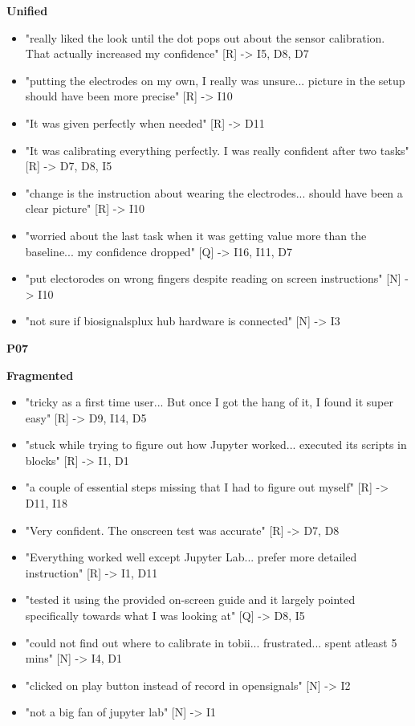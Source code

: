 \documentclass[
]{article}
\begin{document}
\textbf{Unified}

\begin{itemize}
\item
  "really liked the look until the dot pops out about the sensor calibration. That actually increased my confidence" {[}R{]} -\textgreater{} I5, D8, D7
\item
  "putting the electrodes on my own, I really was unsure... picture in the setup should have been more precise" {[}R{]} -\textgreater{} I10
\item
  "It was given perfectly when needed" {[}R{]} -\textgreater{} D11
\item
  "It was calibrating everything perfectly. I was really confident after two tasks" {[}R{]} -\textgreater{} D7, D8, I5
\item
  "change is the instruction about wearing the electrodes... should have been a clear picture" {[}R{]} -\textgreater{} I10
\item
  "worried about the last task when it was getting value more than the baseline... my confidence dropped" {[}Q{]} -\textgreater{} I16, I11, D7
\item
  "put electorodes on wrong fingers despite reading on screen instructions" {[}N{]} -\textgreater{} I10
\item
  "not sure if biosignalsplux hub hardware is connected" {[}N{]} -\textgreater{} I3
\end{itemize}

\textbf{P07}

\textbf{Fragmented}

\begin{itemize}
\item
  "tricky as a first time user... But once I got the hang of it, I found it super easy" {[}R{]} -\textgreater{} D9, I14, D5
\item
  "stuck while trying to figure out how Jupyter worked... executed its scripts in blocks" {[}R{]} -\textgreater{} I1, D1
\item
  "a couple of essential steps missing that I had to figure out myself" {[}R{]} -\textgreater{} D11, I18
\item
  "Very confident. The onscreen test was accurate" {[}R{]} -\textgreater{} D7, D8
\item
  "Everything worked well except Jupyter Lab... prefer more detailed instruction" {[}R{]} -\textgreater{} I1, D11
\item
  "tested it using the provided on-screen guide and it largely pointed specifically towards what I was looking at" {[}Q{]} -\textgreater{} D8, I5
\item
  "could not find out where to calibrate in tobii... frustrated... spent atleast 5 mins" {[}N{]} -\textgreater{} I4, D1
\item
  "clicked on play button instead of record in opensignals" {[}N{]} -\textgreater{} I2
\item
  "not a big fan of jupyter lab" {[}N{]} -\textgreater{} I1
\end{itemize}
\end{document}
